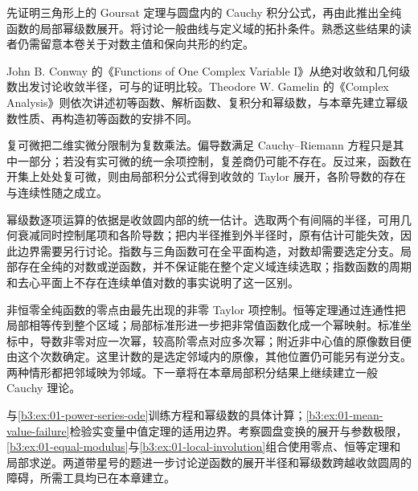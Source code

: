 先证明三角形上的 Goursat 定理与圆盘内的 Cauchy 积分公式，再由此推出全纯函数的局部幂级数展开。将讨论一般曲线与定义域的拓扑条件。熟悉这些结果的读者仍需留意本卷关于对数主值和保向共形的约定。

\ProseParagraphBreak

John B. Conway 的《Functions of One Complex Variable I》\cite[Chapter III, \S1, pp. 30--31]{Conway1978Functions}从绝对收敛和几何级数出发讨论收敛半径，可与的证明比较。Theodore W. Gamelin 的《Complex Analysis》\cite{Gamelin2001Complex}则依次讲述初等函数、解析函数、复积分和幂级数，与本章先建立幂级数性质、再构造初等函数的安排不同。






\begin{chaptersummary}
复可微把二维实微分限制为复数乘法。偏导数满足 Cauchy--Riemann 方程只是其中一部分；若没有实可微的统一余项控制，复差商仍可能不存在。反过来，函数在开集上处处复可微，则由局部积分公式得到收敛的 Taylor 展开，各阶导数的存在与连续性随之成立。

\ProseParagraphBreak

幂级数逐项运算的依据是收敛圆内部的统一估计。选取两个有间隔的半径，可用几何衰减同时控制尾项和各阶导数；把内半径推到外半径时，原有估计可能失效，因此边界需要另行讨论。指数与三角函数可在全平面构造，对数却需要选定分支。局部存在全纯的对数或逆函数，并不保证能在整个定义域连续选取；指数函数的周期和去心平面上不存在连续单值对数的事实说明了这一区别。

\ProseParagraphBreak

非恒零全纯函数的零点由最先出现的非零 Taylor 项控制。恒等定理通过连通性把局部相等传到整个区域；局部标准形进一步把非常值函数化成一个幂映射。标准坐标中，导数非零对应一次幂，较高阶零点对应多次幂；附近非中心值的原像数目便由这个次数确定。这里计数的是选定邻域内的原像，其他位置仍可能另有逆分支。两种情形都把邻域映为邻域。下一章将在本章局部积分结果上继续建立一般 Cauchy 理论。
\end{chaptersummary}

\BookExercises

与\cref{b3:ex:01-power-series-ode}训练方程和幂级数的具体计算；\cref{b3:ex:01-mean-value-failure}检验实变量中值定理的适用边界。考察圆盘变换的展开与参数极限，\cref{b3:ex:01-equal-modulus}与\cref{b3:ex:01-local-involution}组合使用零点、恒等定理和局部求逆。两道带星号的题进一步讨论逆函数的展开半径和幂级数跨越收敛圆周的障碍，所需工具均已在本章建立。

